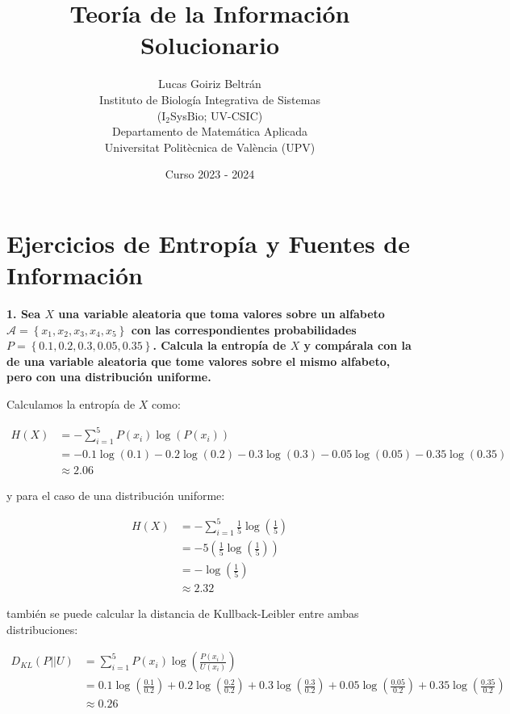 \documentclass{article}
\title{Teoría de la Información\\Solucionario}
\date{Curso 2023 - 2024}
\author{Lucas Goiriz Beltrán\\ Instituto de Biología Integrativa de Sistemas\\(I$_2$SysBio; UV-CSIC)\\Departamento de Matemática Aplicada\\Universitat Politècnica de València (UPV)}
\begin{document}
\maketitle

\section{Ejercicios de Entropía y Fuentes de Información}

\textbf{
1. Sea $X$ una variable aleatoria que toma valores sobre un alfabeto $\mathcal{A} = \left\{x_1,x_2,x_3,x_4,x_5\right\}$ con las correspondientes probabilidades $P = \left\{0.1,0.2,0.3,0.05,0.35\right\}$. Calcula la entropía de $X$ y compárala con la de una variable aleatoria que tome valores sobre el mismo alfabeto, pero con una distribución uniforme.
}

\vspace{0.5cm}

Calculamos la entropía de $X$ como:

\begin{align*}
    H(X) &= -\sum_{i=1}^{5}P(x_i)\log\left(P(x_i)\right)\\
    &= -0.1\log (0.1) - 0.2\log (0.2) - 0.3\log (0.3) - 0.05\log (0.05) - 0.35\log (0.35)\\
    &\approx 2.06
\end{align*}

y para el caso de una distribución uniforme:

\begin{align*}
    H(X) &= -\sum_{i=1}^{5}\frac{1}{5}\log\left(\frac{1}{5}\right)\\
    &= -5\left(\frac{1}{5}\log\left(\frac{1}{5}\right)\right)\\
    &= -\log\left(\frac{1}{5}\right)\\
    &\approx 2.32
\end{align*}

también se puede calcular la distancia de Kullback-Leibler entre ambas distribuciones:

\begin{align*}
    D_{KL}(P||U) &= \sum_{i=1}^{5}P(x_i)\log\left(\frac{P(x_i)}{U(x_i)}\right)\\
    &= 0.1\log\left(\frac{0.1}{0.2}\right) + 0.2\log\left(\frac{0.2}{0.2}\right) + 0.3\log\left(\frac{0.3}{0.2}\right) + 0.05\log\left(\frac{0.05}{0.2}\right) + 0.35\log\left(\frac{0.35}{0.2}\right)\\
    &\approx 0.26
\end{align*}
\end{document}
